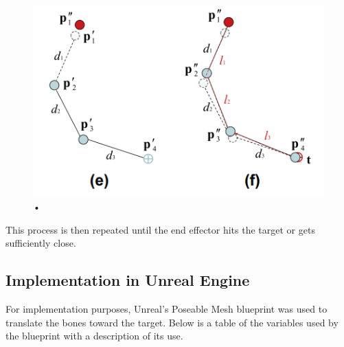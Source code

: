 \begin{figure}[hbtp]
 \centering
 \includegraphics[scale=1]{ef.PNG}
 \caption{•}
 \end{figure}
  
This process is then repeated until the end effector hits the target or gets sufficiently close. 

\subsection{Implementation in Unreal Engine}

For implementation purposes, Unreal's Poseable Mesh blueprint was used to translate the bones toward the target. Below is a table of the variables used by the blueprint with a description of its use. 


